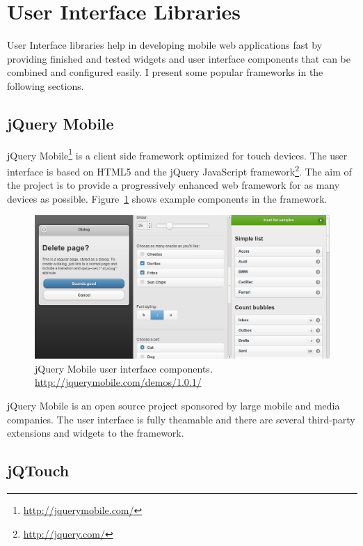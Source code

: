 \section{User Interface Libraries}

User Interface libraries help in developing mobile web applications
fast by providing finished and tested widgets and user interface
components that can be combined and configured easily. I present some
popular frameworks in the following sections.

\subsection{jQuery Mobile}

jQuery Mobile\footnote{\url{http://jquerymobile.com/}} is a client
side framework optimized for touch devices. The user interface is
based on HTML5 and the jQuery JavaScript
framework\footnote{\url{http://jquery.com/}}. The aim of the project
is to provide a progressively enhanced web framework for as many
devices as possible. Figure~\ref{figure:jquerymobile.png} shows
example components in the framework.

\begin{figure}[h!]
  \begin{center}
    \includegraphics[width=\textwidth]{images/jquerymobile.png}
    \caption{jQuery Mobile user interface
      components. \url{http://jquerymobile.com/demos/1.0.1/}}
    \label{figure:jquerymobile.png}
  \end{center}
\end{figure}

jQuery Mobile is an open source project sponsored by large mobile and
media companies. The user interface is fully theamable and there are
several third-party extensions and widgets to the framework.

\subsection{jQTouch}

